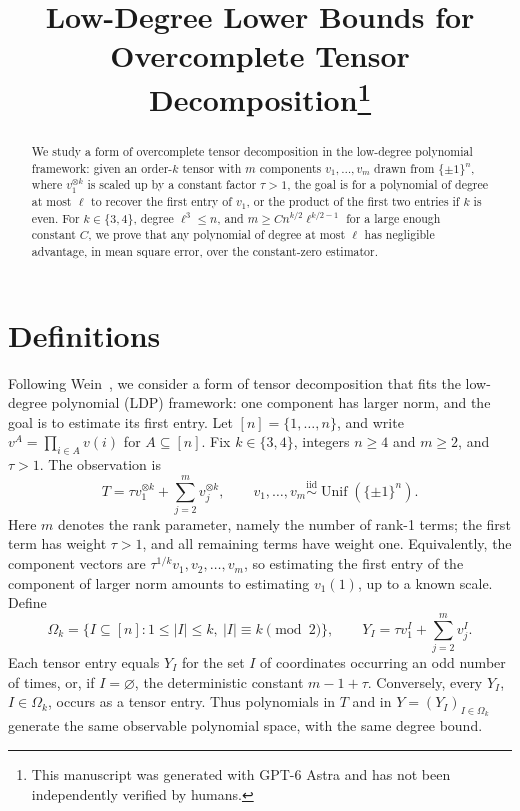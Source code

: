 \documentclass[11pt]{article}
\title{Low-Degree Lower Bounds for Overcomplete Tensor Decomposition\thanks{This manuscript was generated with GPT-6 Astra and has not been independently verified by humans.}}
\author{}
\date{}
\DeclareMathOperator{\Unif}{Unif}
\begin{document}
\maketitle

\begin{abstract}
We study a form of overcomplete tensor decomposition in the low-degree polynomial framework: given an order-\(k\) tensor with $m$ components $v_1,\dots,v_m$ drawn from $\{\pm 1\}^n$, where $v_1^{\otimes k}$ is scaled up by a constant factor $\tau >1$, the goal is for a polynomial of degree at most \(\ell\) to recover the first entry of $v_1$, or the product of the first two entries if $k$ is even.
For \(k\in\{3,4\}\), degree \(\ell^3 \le n\), and \(m \ge C n^{k/2}\ell^{k/2-1}\) for a large enough constant $C$, we prove that any polynomial of degree at most \(\ell\) has negligible advantage, in mean square error, over the constant-zero estimator.
\end{abstract}

\section{Definitions}

Following Wein~\cite[Sections~1.1--1.2]{Wein2023}, we consider a form of tensor decomposition that fits the low-degree polynomial (LDP) framework: one component has larger norm, and the goal is to estimate its first entry.
Let \([n]=\{1,\ldots,n\}\), and write \(v^A=\prod_{i\in A}v(i)\) for \(A\subseteq[n]\).
Fix \(k\in\{3,4\}\), integers \(n\ge4\) and \(m\ge2\), and \(\tau>1\).
The observation is
\begin{equation}\label{eq:model}
T=\tau v_1^{\otimes k}+\sum_{j=2}^{m}v_j^{\otimes k},
\qquad
v_1,\ldots,v_{m}\stackrel{\mathrm{iid}}{\sim}
\Unif(\{\pm1\}^n).
\end{equation}
Here \(m\) denotes the rank parameter, namely the number of rank-1 terms; the first term has weight \(\tau>1\), and all remaining terms have weight one.
Equivalently, the component vectors are \(\tau^{1/k}v_1,v_2,\ldots,v_m\), so estimating the first entry of the component of larger norm amounts to estimating \(v_1(1)\), up to a known scale.
Define
\begin{equation}\label{eq:observations}
\Omega_k=\{I\subseteq[n]:1\le |I|\le k,\ |I|\equiv k\pmod2\},
\qquad
Y_I=\tau v_1^I+\sum_{j=2}^{m}v_j^I .
\end{equation}
Each tensor entry equals \(Y_I\) for the set \(I\) of coordinates occurring an odd number of times, or, if \(I=\varnothing\), the deterministic constant \(m-1+\tau\).
Conversely, every \(Y_I\), \(I\in\Omega_k\), occurs as a tensor entry.
Thus polynomials in \(T\) and in \(Y=(Y_I)_{I\in\Omega_k}\) generate the same observable polynomial space, with the same degree bound.
\end{document}
